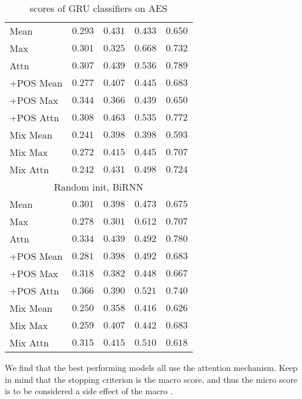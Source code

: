 \begin{table}
\begin{tabular}{lrrrr}
    Mean & $0.293$ & $0.431$ & $0.433$ & $0.650$ \\
    Max & $0.301$ & $0.325$ & $\mathbf{0.668}$ & $0.732$ \\
    Attn & $0.307$ & $0.439$ & $0.536$ & $\mathbf{0.789}$ \\
    +POS Mean & $0.277$ & $0.407$ & $0.445$ & $0.683$ \\
    +POS Max & $0.344$ & $0.366$ & $0.439$ & $0.650$ \\
    +POS Attn & $0.308$ & $\mathbf{0.463}$ & $0.535$ & $0.772$ \\
    Mix Mean & $0.241$ & $0.398$ & $0.398$ & $0.593$ \\
    Mix Max & $0.272$ & $0.415$ & $0.445$ & $0.707$ \\
    Mix Attn & $0.242$ & $0.431$ & $0.498$ & $0.724$ \\
    \midrule \multicolumn{5}{c}{Random init, BiRNN} \\ \midrule
    Mean & $0.301$ & $0.398$ & $0.473$ & $0.675$ \\
    Max & $0.278$ & $0.301$ & $0.612$ & $0.707$ \\
    Attn & $0.334$ & $0.439$ & $0.492$ & $0.780$ \\
    +POS Mean & $0.281$ & $0.398$ & $0.492$ & $0.683$ \\
    +POS Max & $0.318$ & $0.382$ & $0.448$ & $0.667$ \\
    +POS Attn & $\mathbf{0.366}$ & $0.390$ & $0.521$ & $0.740$ \\
    Mix Mean & $0.250$ & $0.358$ & $0.416$ & $0.626$ \\
    Mix Max & $0.259$ & $0.407$ & $0.442$ & $0.683$ \\
    Mix Attn & $0.315$ & $0.415$ & $0.510$ & $0.618$ \\
    \bottomrule
  \end{tabular}
  \caption{\FI scores of GRU classifiers on AES}
  \label{tab:gru-results}
\end{table}

We find that the best performing models all use the attention mechanism.
Keep in mind that the stopping criterion is the macro \FI score, and thus
the micro \FI score is to be considered a side effect of the macro \FI.


